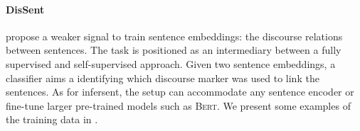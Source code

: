 





\paragraph{DisSent} \textcite{nie_19} propose a weaker signal to train sentence embeddings: the discourse relations between sentences. The task is positioned as an intermediary between a fully supervised and self-supervised approach. Given two sentence embeddings, a classifier aims a identifying which discourse marker was used to link the sentences. As for infersent, the setup can accommodate any sentence encoder  or fine-tune larger pre-trained models such as \textsc{Bert}. We present some examples of the training data in .

